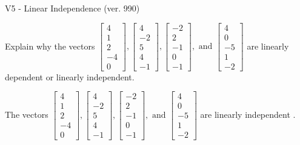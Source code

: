\begin{exercise}
  \begin{exerciseTitle}V5 - Linear Independence (ver. 990)\end{exerciseTitle}
  \begin{exerciseStatement}
    Explain why the vectors \(\left[\begin{array}{r}
4 \\
1 \\
2 \\
-4 \\
0
\end{array}\right] , \left[\begin{array}{r}
4 \\
-2 \\
5 \\
4 \\
-1
\end{array}\right] , \left[\begin{array}{r}
-2 \\
2 \\
-1 \\
0 \\
-1
\end{array}\right] , \text{ and } \left[\begin{array}{r}
4 \\
0 \\
-5 \\
1 \\
-2
\end{array}\right]\) are linearly dependent or linearly independent.	


  \end{exerciseStatement}
  \begin{exerciseAnswer}
   The vectors \(\left[\begin{array}{r}
4 \\
1 \\
2 \\
-4 \\
0
\end{array}\right] , \left[\begin{array}{r}
4 \\
-2 \\
5 \\
4 \\
-1
\end{array}\right] , \left[\begin{array}{r}
-2 \\
2 \\
-1 \\
0 \\
-1
\end{array}\right] , \text{ and } \left[\begin{array}{r}
4 \\
0 \\
-5 \\
1 \\
-2
\end{array}\right]\) are 
  	 linearly independent  .
  


  \end{exerciseAnswer}
\end{exercise}